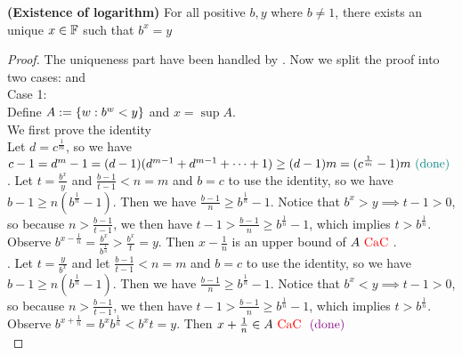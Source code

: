 \documentclass{report}
\begin{document}
\begin{theorem}
\label{1.4.11}
\textbf{(Existence of logarithm)} For all positive  $b,y$ where $b\neq 1$, there exists an unique  $x\in\mathbb{F} $ such that $b^x=y$  
\end{theorem}
\begin{proof}
The uniqueness part have been handled by . Now we split the proof into two cases:  and \\

Case 1: \\

Define $A:=\{ w:b^w<y \}$ and $x=\sup A$.\\

We first prove the identity \\

Let $d=c^{\frac{1}{m}}$, so we have $c-1=d^m-1=(d-1)(d^{m-1}+d^{m-1}+\cdots +1)\geq (d-1)m=(c^{\frac{1}{m}}-1)m\textcolor{teal}{\text{ (done) }}$\\


. Let $t=\frac{b^x}{y}$ and $\frac{b-1}{t-1}<n=m$ and $b=c$ to use the identity, so we have  $b-1\geq n(b^{\frac{1}{n}}-1)$. Then we have $\frac{b-1}{n}\geq b^{\frac{1}{n}}-1$. Notice that $b^x>y\implies t-1>0$, so because $n>\frac{b-1}{t-1}$, we then have $t-1>\frac{b-1}{n}\geq b^{\frac{1}{n}}-1$, which implies $t> b^{\frac{1}{n}}$.\\

 Observe $b^{x-\frac{1}{n}}=\frac{b^x}{b^{\frac{1}{n}}}>\frac{b^x}{t}=y$. Then $x-\frac{1}{n}$ is an upper bound of $A\text{ \textcolor{red}{CaC} }$.\\


. Let $t=\frac{y}{b^x}$ and let $\frac{b-1}{t-1}<n=m$ and $b=c$ to use the identity, so we have  $b-1\geq n(b^{\frac{1}{n}}-1)$. Then we have $\frac{b-1}{n}\geq b^{\frac{1}{n}}-1$. Notice that $b^x<y\implies t-1>0$, so because $n>\frac{b-1}{t-1}$, we then have $t-1>\frac{b-1}{n}\geq b^{\frac{1}{n}}-1$, which implies $t>b^{\frac{1}{n}}$.\\

Observe $b^{x+\frac{1}{n}}=b^xb^{\frac{1}{n}}<b^xt=y$. Then $x+\frac{1}{n}\in A\text{ \textcolor{red}{CaC} }\textcolor{violet}{\text{ (done) }}$\\


\end{proof}
\end{document}

